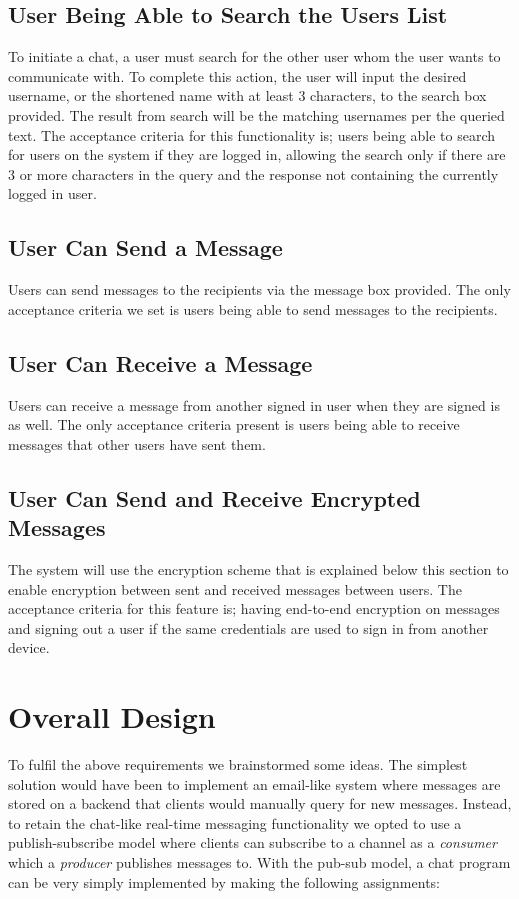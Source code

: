 \documentclass[11pt,a4paper]{report}
\begin{document}
\subsection{User Being Able to Search the Users List}
To initiate a chat, a user must search for the other user whom the user wants to communicate with. To complete this action, the user will input the desired username, or the shortened name with at least 3 characters, to the search box provided. The result from search will be the matching usernames per the queried text. The acceptance criteria for this functionality is; users being able to search for users on the system if they are logged in, allowing the search only if there are 3 or more characters in the query and the response not containing the currently logged in user.
\subsection{User Can Send a Message}
Users can send messages to the recipients via the message box provided. The only acceptance criteria we set is users being able to send messages to the recipients.
\subsection{User Can Receive a Message}
Users can receive a message from another signed in user when they are signed is as well. The only acceptance criteria present is users being able to receive messages that other users have sent them.
\subsection{User Can Send and Receive Encrypted Messages}
The system will use the encryption scheme that is explained below this section to enable encryption between sent and received messages between users. The acceptance criteria for this feature is; having end-to-end encryption on messages and signing out a user if the same credentials are used to sign in from another device.

\section{Overall Design}

To fulfil the above requirements we brainstormed some ideas. The simplest solution would have been to implement an email-like system where messages are stored on a backend that clients would manually query for new messages. Instead, to retain the chat-like real-time messaging functionality we opted to use a publish-subscribe model where clients can subscribe to a channel as a \emph{consumer} which a \emph{producer} publishes messages to. With the pub-sub model, a chat program can be very simply implemented by making the following assignments:
\end{document}
